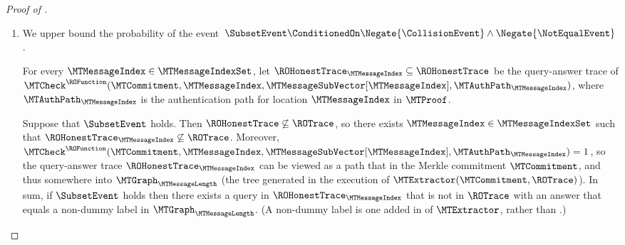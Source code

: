 \begin{proof}[Proof of ]
\begin{enumerate}
Since the event $\CollisionEvent$ does not hold ($\ROTrace$ contains no collisions), each vertex in the tree $\MTGraph_{\MTMessageLength}$ is labeled at most once. There are at most $\min\{2\ROQueryBound_{1}+1,2\MTMessageLength\}$ non-dummy labels in $\MTGraph_{\MTMessageLength}$: the root vertex is labeled separately, and each query in $\ROTrace$ results in at most $2$ newly-labeled vertices; moreover, there are at most $2\MTMessageLength$ vertices in the tree $\MTGraph_{\MTMessageLength}$. Hence the probability that any fixed query in $\ROOpenTrace$ (that is not in $\ROTrace$) has an answer that equals one of the labels in $\MTGraph_{\MTMessageLength}$ is at most $\frac{\min\{2\ROQueryBound_{1}+1,2\MTMessageLength\}}{2^{\ROOutputSize}}$.

Taking a union bound over all queries in $\ROOpenTrace$,
\begin{align*}
\Pr\left[\NotEqualEvent \ConditionedOn \Negate{\CollisionEvent}\right]
\leq
\Cardinality{\ROOpenTrace} \cdot \frac{\min\{2\ROQueryBound_{1}+1,2\MTMessageLength\}}{2^{\ROOutputSize}}
=
\ROQueryBound_{2} \cdot \frac{\min\{2\ROQueryBound_{1}+1,2\MTMessageLength\}}{2^{\ROOutputSize}}
\enspace.
\end{align*}

 \item We upper bound the probability of the event $\left.\SubsetEvent \ConditionedOn \Negate{\CollisionEvent} \land \Negate{\NotEqualEvent} \right.$.

For every $\MTMessageIndex \in \MTMessageIndexSet$, let $\ROHonestTrace_{\MTMessageIndex} \subseteq \ROHonestTrace$ be the query-answer trace of $\MTCheck^{\ROFunction}(\MTCommitment,\MTMessageIndex,\MTMessageSubVector[\MTMessageIndex],\MTAuthPath_{\MTMessageIndex})$, where $\MTAuthPath_{\MTMessageIndex}$ is the authentication path for location $\MTMessageIndex$ in $\MTProof$.

Suppose that $\SubsetEvent$ holds. Then $\ROHonestTrace \not \subseteq \ROTrace$, so there exists $\MTMessageIndex \in \MTMessageIndexSet$ such that $\ROHonestTrace_{\MTMessageIndex} \not \subseteq \ROTrace$. Moreover, $\MTCheck^{\ROFunction}(\MTCommitment,\MTMessageIndex,\MTMessageSubVector[\MTMessageIndex],\MTAuthPath_{\MTMessageIndex})=1$, so the query-answer trace $\ROHonestTrace_{\MTMessageIndex}$ can be viewed as a path that  in the Merkle commitment $\MTCommitment$, and thus  somewhere into $\MTGraph_{\MTMessageLength}$ (the tree generated in the execution of $\MTExtractor(\MTCommitment,\ROTrace)$). In sum, if $\SubsetEvent$ holds then there exists a query in $\ROHonestTrace_{\MTMessageIndex}$ that is not in $\ROTrace$ with an answer that equals a non-dummy label in $\MTGraph_{\MTMessageLength}$. (A non-dummy label is one added in  of $\MTExtractor$, rather than .)


\end{enumerate}
\end{proof}
